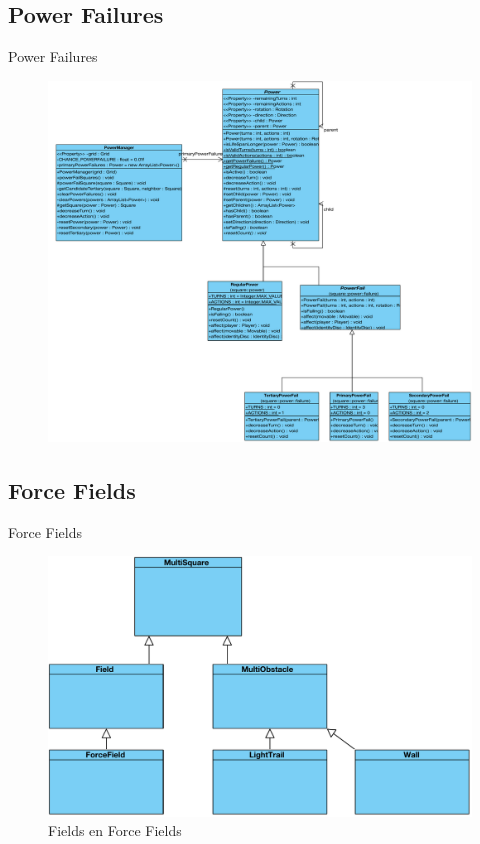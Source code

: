 \documentclass[t]{beamer}
\begin{document}
\subsection{Power Failures}
\begin{frame}{Power Failures}
\begin{figure}
	\center
	\includegraphics[width= 0.65\linewidth]{img/powerfail.pdf}
\end{figure}
\end{frame}


\subsection{Force Fields}
\begin{frame}{Force Fields}
\begin{figure}
	\center
	\includegraphics[width= 0.6\linewidth]{img/forcefield.pdf}
	\caption{Fields en Force Fields}
\end{figure}
\end{frame}
\end{document}
